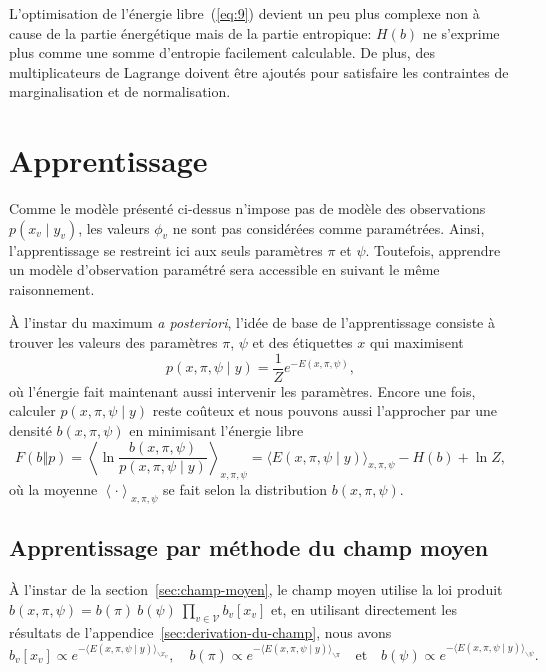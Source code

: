 \documentclass[a4paper,11pt,oneside]{article}
\let\<\langle
\let\>\rangle
\begin{document}
L'optimisation de l'énergie libre~(\ref{eq:9}) devient un
peu plus complexe non à cause de la partie énergétique mais
de la partie entropique: $H(b)$ ne s'exprime plus comme une
somme d'entropie facilement calculable. De plus, des
multiplicateurs de Lagrange doivent être ajoutés pour
satisfaire les contraintes de marginalisation et de
normalisation.



\section{Apprentissage}
\label{sec:apprentissage}

Comme le modèle présenté ci-dessus n'impose pas de modèle
des observations $p(x_v\mid y_v)$, les valeurs $\phi_v$ ne
sont pas considérées comme paramétrées. Ainsi,
l'apprentissage se restreint ici aux seuls paramètres $\pi$
et $\psi$. Toutefois, apprendre un modèle d'observation
paramétré sera accessible en suivant le même raisonnement.

À l'instar du maximum \emph{a posteriori}, l'idée de base de
l'apprentissage consiste à trouver les valeurs des
paramètres $\pi$, $\psi$ et des étiquettes $x$ qui
maximisent
\begin{equation}
  \label{eq:16}
  p(x, \pi, \psi\mid y) = \frac1Z e^{-E(x, \pi, \psi)},
\end{equation}
où l'énergie fait maintenant aussi intervenir les
paramètres. Encore une fois, calculer $p(x, \pi, \psi\mid
y)$ reste coûteux et nous pouvons aussi l'approcher par une
densité $b(x, \pi, \psi)$ en minimisant l'énergie libre
\begin{equation}
  \label{eq:17}
  F(b{\mathop\Vert}p)
  = \left\<
    \ln\frac{b(x,\pi,\psi)}{p(x,\pi,\psi\mid y)}
    \right\>_{x,\pi,\psi}
  = \bigl\<E(x,\pi,\psi\mid y)\bigr\>_{x,\pi,\psi}
    - H(b) + \ln Z,
\end{equation}
où la moyenne $\left\<\cdot\right\>_{x,\pi,\psi}$ se fait
selon la distribution $b(x, \pi, \psi)$.


\subsection{Apprentissage par méthode du champ moyen}
\label{sec:appr-par-meth}

À l'instar de la section~\ref{sec:champ-moyen}, le champ
moyen utilise la loi produit $b(x, \pi, \psi) =
b(\pi)\:b(\psi)\:\prod_{v\in\mathcal V} b_v[x_v]$ et, en
utilisant directement les résultats de
l'appendice~\ref{sec:derivation-du-champ}, nous avons
\begin{equation}
  b_v[x_v] \propto e^{-\bigl\< E(x,\pi,\psi\mid y)
                       \bigr\>_{\backslash x_v}},
  \quad
  b(\pi) \propto e^{-\bigl\< E(x,\pi,\psi\mid y)
                     \bigr\>_{\backslash\pi}}
  \quad\text{et}\quad
  b(\psi)\propto e^{-\bigl\< E(x,\pi,\psi\mid y)
                     \bigr\>_{\backslash\psi}}.
\end{equation}
\end{document}
